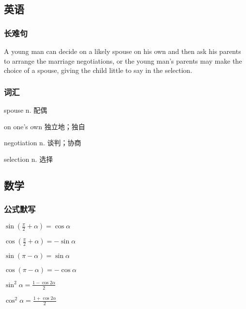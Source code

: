 \documentclass[UTF8]{ctexart}
\begin{document}
\subsection{英语}
\subsubsection{长难句}
A young man can decide on a likely spouse on his own and then ask his parents to arrange the marriage negotiations, or the young man's parents may make the choice of a spouse, giving the child little to say in the selection.
\subsubsection{词汇}
spouse n. 配偶

on one's own 独立地；独自

negotiation n. 谈判；协商

selection n. 选择
\subsection{数学}
\subsubsection{公式默写}
\begin{multicols}{3}
    $\sin\left ( \frac{\pi}{2} + \alpha  \right ) =\cos \alpha$

    $\cos\left ( \frac{\pi}{2}+\alpha\right )=-\sin \alpha$

    $\sin \left ( \pi - \alpha\right )=\sin \alpha$

    $\cos \left ( \pi - \alpha\right )=-\cos \alpha$

    $\sin^2\alpha=\frac{1-\cos 2\alpha}{2}$

    $\cos^2\alpha=\frac{1+\cos 2\alpha}{2}$
\end{multicols}
\end{document}
